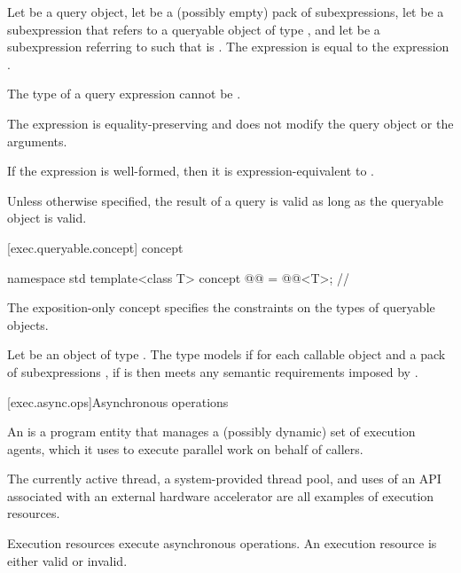 \pnum
Let  be a query object,
let  be a (possibly empty) pack of subexpressions,
let  be a subexpression
that refers to a queryable object  of type , and
let  be a subexpression referring to 
such that  is .
The expression  is equal to
the expression .

\pnum
The type of a query expression cannot be .

\pnum
The expression  is
equality-preserving and
does not modify the query object or the arguments.

\pnum
If the expression  is well-formed,
then it is expression-equivalent to .

\pnum
Unless otherwise specified,
the result of a query is valid as long as the queryable object is valid.

[exec.queryable.concept]{ concept}

\begin{codeblock}
namespace std {
  template<class T>
    concept @@ = @@<T>;   // \expos
}
\end{codeblock}

\pnum
The exposition-only  concept specifies
the constraints on the types of queryable objects.

\pnum
Let  be an object of type .
The type  models 
if for each callable object  and a pack of subexpressions ,
if  is  then
 meets any semantic requirements imposed by .

[exec.async.ops]{Asynchronous operations}

\pnum
An  is a program entity that manages
a (possibly dynamic) set of execution agents,
which it uses to execute parallel work on behalf of callers.
\begin{example}
The currently active thread,
a system-provided thread pool, and
uses of an API associated with an external hardware accelerator
are all examples of execution resources.
\end{example}
Execution resources execute asynchronous operations.
An execution resource is either valid or invalid.

